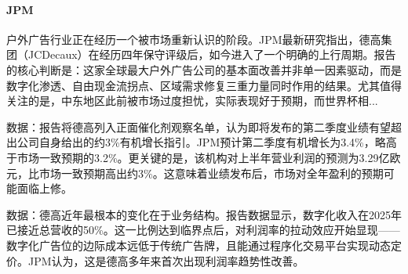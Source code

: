 \documentclass[11pt]{ctexart}
\begin{document}
\paragraph{JPM} 户外广告行业正在经历一个被市场重新认识的阶段。JPM最新研究指出，德高集团（JCDecaux）在经历四年保守评级后，如今进入了一个明确的上行周期。报告的核心判断是：这家全球最大户外广告公司的基本面改善并非单一因素驱动，而是数字化渗透、自由现金流拐点、区域需求修复三重力量同时作用的结果。尤其值得关注的是，中东地区此前被市场过度担忧，实际表现好于预期，而世界杯相...
{\small\color{refgray}数据：报告将德高列入正面催化剂观察名单，认为即将发布的第二季度业绩有望超出公司自身给出的约3\%有机增长指引。JPM预计第二季度有机增长为3.4\%，略高于市场一致预期的3.2\%。更关键的是，该机构对上半年营业利润的预测为3.29亿欧元，比市场一致预期高出约3\%。这意味着业绩发布后，市场对全年盈利的预期可能面临上修。\par}
{\small\color{refgray}数据：德高近年最根本的变化在于业务结构。报告数据显示，数字化收入在2025年已接近总营收的50\%。这一比例达到临界点后，对利润率的拉动效应开始显现——数字化广告位的边际成本远低于传统广告牌，且能通过程序化交易平台实现动态定价。JPM认为，这是德高多年来首次出现利润率趋势性改善。\par}
\end{document}
